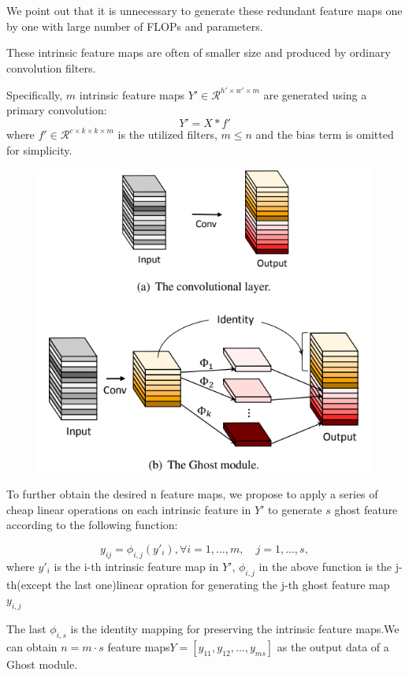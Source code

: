 \documentclass[11pt]{article}
\begin{document}
We point out that it is unnecessary to generate these redundant feature maps one by one with large number of FLOPs and parameters.

These intrinsic feature maps are often of smaller size and produced by ordinary convolution filters.

Specifically, $m$ intrinsic feature maps $Y'\in\mathcal{R}^{h'\times w'\times m}$ are generated using a primary convolution:
$$Y' = X*f'$$
where $f'\in \mathcal{R}^{c\times k\times k\times m}$ is the utilized filters, $m\leq n$ and the bias term is omitted for simplicity.

\begin{figure}[H]
	\centering
	\includegraphics[scale = 0.5]{67}
\end{figure}

To further obtain the desired n feature maps, we propose to apply a series of cheap linear operations on each intrinsic feature in $Y'$ to generate $s$ ghost feature according to the following function:

$$y_{ij}=\phi_{i,j}(y'_i), \forall i=1,...,m,  \quad j=1,...,s,$$
where $y'_i$ is the i-th intrinsic feature map in $Y'$, $\phi_{i,j}$ in the above function is the j-th(except the last one)linear opration for generating the j-th ghost feature map $y_{i,j}$

The last $\phi_{i,s}$ is the identity mapping for preserving the intrinsic feature maps.We can obtain $n=m\cdot s$ feature maps$Y=[y_{11},y_{12},...,y_{ms}]$ as the output data of a Ghost module.
\end{document}
